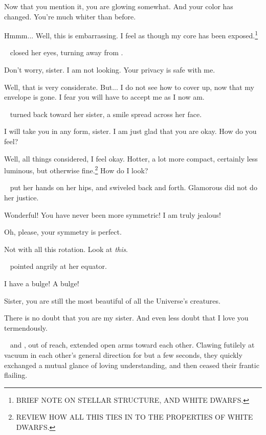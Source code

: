\documentclass[main.tex]{subfiles}
\begin{document}
\newpara \Merope Now that you mention it, you are glowing somewhat.  And your color has changed. You're much whiter than before.

\newpara \Maia Hmmm...  Well, this is embarrassing.  I feel as though my core has been exposed.\footnote{BRIEF NOTE ON STELLAR STRUCTURE, AND WHITE DWARFS.}    

\newpara \nar \rmmerope~ closed her eyes, turning away from \rmmaia.

\newpara \Merope Don't worry, sister.  I am not looking.  Your privacy is safe with me.

\newpara \Maia Well, that is very considerate.  But... I do not see how to cover up, now that my envelope is gone. I fear you will have to accept me as I now am.

\newpara \nar \rmmerope~ turned back toward her sister, a smile spread across her face.

\newpara \Merope I will take you in any form, sister.  I am just glad that you are okay.  How do you feel?

\newpara \Maia Well, all things considered, I feel okay.  Hotter, a lot more compact, certainly less luminous, but otherwise fine.\footnote{REVIEW HOW ALL THIS TIES IN TO THE PROPERTIES OF WHITE DWARFS.}  How do I look?

\newpara \nar \rmmaia~ put her hands on her hips, and swiveled back and forth.  Glamorous did not do her justice.

\newpara \Merope Wonderful!  You have never been more symmetric!  I am truly jealous!

\newpara \Maia Oh, please, your symmetry is perfect.  

\newpara \Merope Not with all this rotation.  Look at \textit{this}.

\newpara \nar \rmmerope~ pointed angrily at her equator. 

\newpara \Merope I have a bulge!  A bulge!

\newpara \Maia Sister, you are still the most beautiful of all the Universe's creatures.

\newpara \Merope There is no doubt that you are my sister.  And even less doubt that I love you termendously.

\newpara \nar \rmmaia~ and \rmmerope, out of reach, extended open arms toward each other.  Clawing futilely at vacuum in each other's general direction for but a few seconds, they quickly exchanged a mutual glance of loving understanding, and then ceased their frantic flailing.
\end{document}
